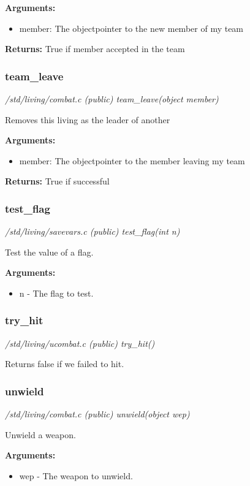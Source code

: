 {\bf Arguments:}
\begin{itemize}
\item     member: The objectpointer to the new member of my team
\end{itemize}

{\bf Returns:}        True if member accepted in the team


\subsubsection{team\_leave}

{\em /std/living/combat.c (public) team\_leave(object member)}

Removes this living as the leader of another

{\bf Arguments:}
\begin{itemize}
\item     member: The objectpointer to the member leaving my team
\end{itemize}

{\bf Returns:}    True if successful


\subsubsection{test\_flag}

{\em /std/living/savevars.c (public) test\_flag(int n)}

Test the value of a flag.

{\bf Arguments:}
\begin{itemize}
\item      n - The flag to test.
\end{itemize}


\subsubsection{try\_hit}

{\em /std/living/ucombat.c (public) try\_hit()}

Returns false if we failed to hit.


\subsubsection{unwield}

{\em /std/living/combat.c (public) unwield(object wep)}

Unwield a weapon.

{\bf Arguments:}
\begin{itemize}
\item     wep - The weapon to unwield.
\end{itemize}

